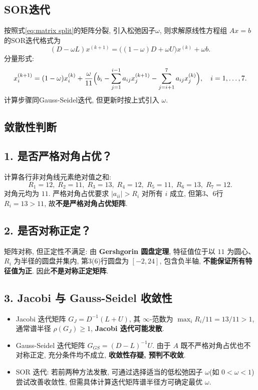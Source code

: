 \documentclass[zihao=-4,a4paper]{ctexart}
\begin{document}
\subsection{SOR迭代}
按照式\eqref{eq:matrix split}的矩阵分裂, 引入松弛因子$\omega$, 则求解原线性方程组 $Ax=b$ 的SOR迭代格式为
\[
(D - \omega L)x^{(k+1)} = \bigl((1-\omega)D + \omega U\bigr)x^{(k)} + \omega b.
\]
分量形式: 
\[
x_i^{(k+1)} = (1-\omega)x_i^{(k)} + \frac{\omega}{11}\Bigl(b_i - \sum_{j=1}^{i-1} a_{ij}x_j^{(k+1)} - \sum_{j=i+1}^{7} a_{ij}x_j^{(k)}\Bigr), \quad i=1,\dots,7.
\]
计算步骤同Gauss-Seidel迭代, 但更新时按上式引入 $\omega$. 
\subsection{敛散性判断}
\subsection*{1. 是否严格对角占优？}
计算各行非对角线元素绝对值之和: 
\[
R_1=12,\; R_2=11,\; R_3=13,\; R_4=12,\; R_5=11,\; R_6=13,\; R_7=12.
\]
对角元均为 $11$. 严格对角占优要求 $|a_{ii}|>R_i$ 对所有 $i$ 成立, 但第3、6行 $R_i=13>11$, 故\textbf{不是严格对角占优矩阵}. 

\subsection*{2. 是否对称正定？}
矩阵对称, 但正定性不满足: 由 \textbf{Gershgorin 圆盘定理}, 特征值位于以 $11$ 为圆心、$R_i$ 为半径的圆盘并集内, 第3(6)行圆盘为 $[-2,24]$, 包含负半轴, \textbf{不能保证所有特征值为正}. 因此\textbf{不是对称正定矩阵}. 

\subsection*{3. Jacobi 与 Gauss-Seidel 收敛性}
\begin{itemize}
\item Jacobi 迭代矩阵 $G_J = D^{-1}(L+U)$, 其 $\infty$-范数为 $\max_i R_i/11 = 13/11 >1$, 通常谱半径 $\rho(G_J)\ge 1$, \textbf{Jacobi 迭代可能发散}. 
\item Gauss-Seidel 迭代矩阵 $G_{GS} = (D-L)^{-1}U$. 由于 $A$ 既不严格对角占优也不对称正定, 充分条件均不成立, \textbf{收敛性存疑, 预判不收敛}. 
\item SOR 迭代: 若前两种方法发散, 可通过选择适当的低松弛因子 $\omega$(如 $0<\omega<1$)尝试改善收敛性, 但需具体计算迭代矩阵谱半径方可确定最优 $\omega$. 
\end{itemize}
\end{document}
